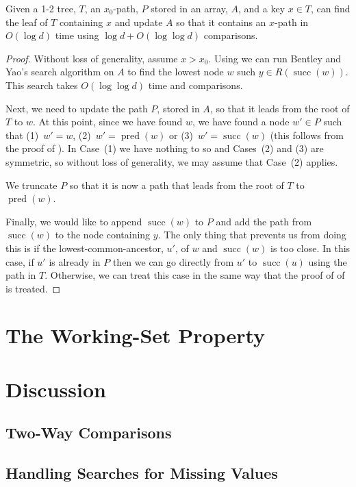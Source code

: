 \documentclass{patmorin}
\DeclareMathOperator{\scc}{succ}
\DeclareMathOperator{\pred}{pred}
\begin{document}
\begin{lem}
  Given a 1-2 tree, $T$, an $x_0$-path, $P$ stored in an array, $A$, and
  a key $x\in T$, can find the leaf of $T$ containing $x$ and update $A$
  so that it contains an $x$-path in $O(\log d)$ time using $\log d +
  O(\log\log d)$ comparisons.
\end{lem}

\begin{proof}
  Without loss of generality, assume $x>x_0$.  Using
   we can run Bentley and Yao's search algorithm
  on $A$ to find the lowest node $w$ such $y\in R(\scc(w))$.  This search
  takes $O(\log\log d)$ time and comparisons.

  Next, we need to update the path $P$, stored in $A$, so that it
  leads from the root of $T$ to $w$.  At this point, since we have
  found $w$, we have found a node $w'\in P$ such that (1)~$w'=w$,
  (2)~$w'=\pred(w)$ or (3)~$w'=\scc(w)$ (this follows from the proof
  of ).  In Case~(1) we have nothing to so and
  Cases~(2) and (3) are symmetric, so without loss of generality, we
  may assume that Case~(2) applies.

  We truncate $P$ so that it is now a path that leads from the root of $T$
  to $\pred(w)$.

  Finally, we would like to append $\scc(w)$ to $P$ and add the path from
  $\scc(w)$ to the node containing $y$.  The only thing that prevents
  us from doing this is if the lowest-common-ancestor, $u'$, of $w$
  and $\scc(w)$ is too close.  In this case, if $u'$ is already in $P$
  then we can go directly from $u'$ to $\scc(u)$ using the path in $T$.
  Otherwise, we can treat this case in the same way that the proof of
  of  is treated.
\end{proof}


\section{The Working-Set Property}

\section{Discussion}

\subsection{Two-Way Comparisons}

\subsection{Handling Searches for Missing Values}
\end{document}
